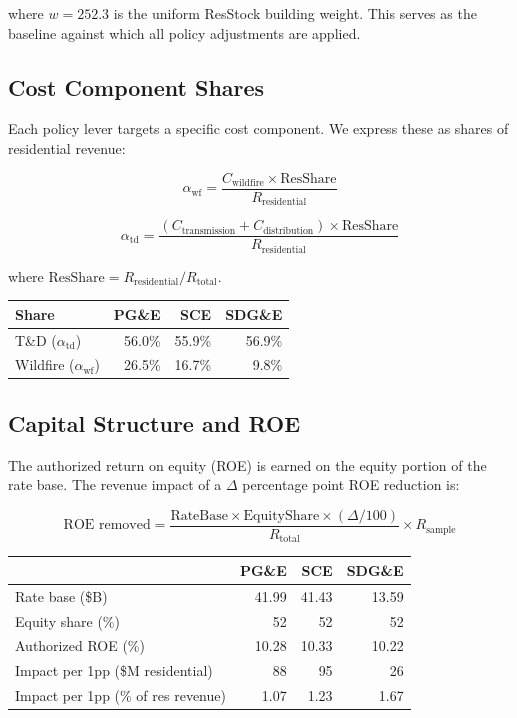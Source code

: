 \documentclass[11pt]{article}
\begin{document}
where $w = 252.3$ is the uniform ResStock building weight. This serves as the baseline against which all policy adjustments are applied.

\subsection{Cost Component Shares}

Each policy lever targets a specific cost component. We express these as shares of residential revenue:

\begin{equation}
\alpha_{\text{wf}} = \frac{C_{\text{wildfire}} \times \text{ResShare}}{R_{\text{residential}}}
\end{equation}

\begin{equation}
\alpha_{\text{td}} = \frac{(C_{\text{transmission}} + C_{\text{distribution}}) \times \text{ResShare}}{R_{\text{residential}}}
\end{equation}

where $\text{ResShare} = R_{\text{residential}} / R_{\text{total}}$.

\begin{table}[htbp]
\centering
\begin{tabular}{l r r r}
\toprule
\textbf{Share} & \textbf{PG\&E} & \textbf{SCE} & \textbf{SDG\&E} \\
\midrule
T\&D ($\alpha_{\text{td}}$) & 56.0\% & 55.9\% & 56.9\% \\
Wildfire ($\alpha_{\text{wf}}$) & 26.5\% & 16.7\% & 9.8\% \\
\bottomrule
\end{tabular}
\end{table}

\subsection{Capital Structure and ROE}

The authorized return on equity (ROE) is earned on the equity portion of the rate base. The revenue impact of a $\Delta$ percentage point ROE reduction is:

\begin{equation}
\text{ROE removed} = \frac{\text{RateBase} \times \text{EquityShare} \times (\Delta / 100)}{R_{\text{total}}} \times R_{\text{sample}}
\end{equation}

\begin{table}[htbp]
\centering
\begin{tabular}{l r r r}
\toprule
& \textbf{PG\&E} & \textbf{SCE} & \textbf{SDG\&E} \\
\midrule
Rate base (\$B) & 41.99 & 41.43 & 13.59 \\
Equity share (\%) & 52 & 52 & 52 \\
Authorized ROE (\%) & 10.28 & 10.33 & 10.22 \\
Impact per 1pp (\$M residential) & 88 & 95 & 26 \\
Impact per 1pp (\% of res revenue) & 1.07 & 1.23 & 1.67 \\
\bottomrule
\end{tabular}
\end{table}
\end{document}
